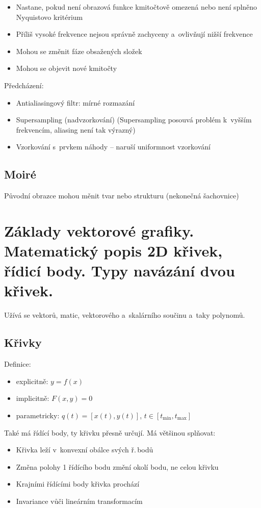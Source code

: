 \begin{itemize}
    \item Nastane, pokud není obrazová funkce kmitočtově omezená nebo není splněno Nyquistovo kritérium
    \item Příliš vysoké frekvence nejsou správně zachyceny a~ovlivňují nižší frekvence
    \item Mohou se změnit fáze obsažených složek
    \item Mohou se objevit nové kmitočty
\end{itemize}

Předcházení:
\begin{itemize}
    \item Antialiasingový filtr: mírné rozmazání
    \item Supersampling (nadvzorkování) (Supersampling posouvá problém k~vyšším frekvencím, aliasing není tak výrazný)
    \item Vzorkování s~prvkem náhody -- naruší uniformnost vzorkování
\end{itemize}

\subsection{Moiré}
Původní obrazce mohou měnit tvar nebo strukturu (nekonečná šachovnice)



\section{Základy vektorové grafiky. Matematický popis 2D křivek, řídicí body. Typy navázání dvou křivek.}
Užívá se vektorů, matic, vektorového a~skalárního součinu a~taky polynomů.

\subsection{Křivky}
Definice:
\begin{itemize}
    \item explicitně: \(y=f(x)\)
    \item implicitně: \(F(x,y)=0\)
    \item parametricky: \(q(t)=[x(t),y(t)]\), \(t\in[t_\mathrm{min},t_\mathrm{max}]\)
\end{itemize}

Také má řídící body, ty křivku přesně určují. Má většinou splňovat:
\begin{itemize}
    \item Křivka leží v~konvexní obálce svých ř.\,bodů
    \item Změna polohy 1 řídícího bodu změní okolí bodu, ne celou křivku
    \item Krajními řídícími body křivka prochází
    \item Invariance vůči lineárním transformacím
\end{itemize}

